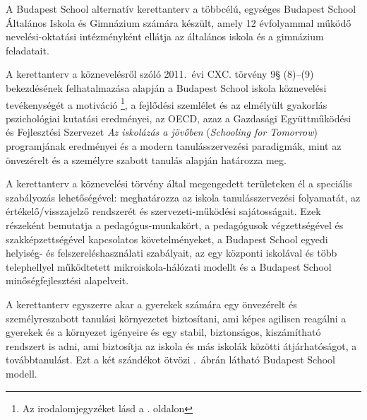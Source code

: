 A Budapest School alternatív kerettanterv a többcélú, egységes	Budapest School Általános Iskola és Gimnázium számára készült, amely 12 évfolyammal működő nevelési-oktatási intézményként ellátja az általános iskola és a gimnázium feladatait.

A kerettanterv a köznevelésről szóló 2011.~évi CXC. törvény 9§ (8)--(9) bekezdésének felhatalmazása alapján a Budapest School iskola köznevelési tevékenységét a motiváció \citep{pink2011drive}\footnote{Az irodalomjegyzéket lásd a \pageref{sec:bibliographyk}. oldalon}, a fejlődési szemlélet \citep{growthmindset} és az elmélyült gyakorlás \citep{ericsson2016peak} pszichológiai kutatási eredményei, az  OECD, azaz a Gazdasági Együttműködési és Fejlesztési Szervezet \emph{Az iskolázás a jövőben}  (\emph{Schooling for Tomorrow}) programjának eredményei \citep{2006schooling} és a modern tanulásszervezési paradigmák, mint az önvezérelt \citep{mitra2012beyond} és a személyre szabott \citep{khan2012one} tanulás alapján határozza meg.

A kerettanterv a köznevelési törvény által megengedett területeken él a speciális szabályozás lehetőségével: meghatározza az iskola tanulásszervezési folyamatát, az értékelő/visszajelző rendszerét és szervezeti-működési sajátosságait. Ezek részeként bemutatja a pedagógus-munkakört, a pedagógusok végzettségével és szakképzettségével kapcsolatos követelményeket, a Budapest School	egyedi helyiség- és felszereléshasználati szabályait, az egy központi iskolával és több telephellyel működtetett mikroiskola-hálózati modellt és a Budapest School minőségfejlesztési alapelveit.

A kerettanterv egyszerre akar a gyerekek számára egy önvezérelt és személyreszabott tanulási környezetet biztosítani, ami képes agilisen reagálni a gyerekek és a környezet igényeire és egy stabil, biztonságos, kiszámítható rendszert is adni, ami biztosítja az iskola és más iskolák közötti átjárhatóságot, a továbbtanulást. Ezt a két szándékot ötvözi .~ábrán látható Budapest School modell.

